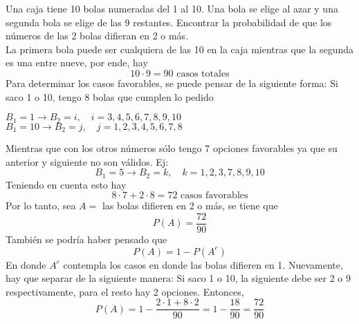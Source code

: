\item Una caja tiene 10 bolas numeradas del 1 al 10. Una bola se elige al azar y una segunda bola se elige de las 9 restantes. Encontrar la probabilidad de que los números de las 2 bolas difieran en 2 o más.\e\\
    La primera bola puede ser cualquiera de las 10 en la caja mientras que la segunda es una entre nueve, por ende, hay \[10\cdot9=90\text{ casos totales}\]
    Para determinar los casos favorables, se puede pensar de la siguiente forma: Si saco 1 o 10, tengo 8 bolas que cumplen lo pedido
    \begin{center}
        $B_1=1\to B_2=i,\quad i=3,4,5,6,7,8,9,10$\\
        $B_1=10\to B_2=j,\quad j=1,2,3,4,5,6,7,8$ 
    \end{center}
    Mientras que con los otros números sólo tengo 7 opciones favorables ya que su anterior y siguiente no son válidos. Ej:\[B_1=5\to B_2=k,\quad k=1,2,3,7,8,9,10\]
    Teniendo en cuenta esto hay\[8\cdot7+2\cdot8=72\text{ casos favorables}\]
    Por lo tanto, sea $A=$ las bolas difieren en 2 o más, se tiene que\[P(A)=\frac{72}{90}\]
    También se podría haber pensado que\[P(A)=1-P(A^c)\]
    En donde $A^c$ contempla los casos en donde las bolas difieren en 1. Nuevamente, hay que separar de la siguiente manera: Si saco 1 o 10, la siguiente debe ser 2 o 9 respectivamente, para el resto hay 2 opciones. Entonces,
    \[P(A)=1-\frac{2\cdot1+8\cdot2}{90}=1-\frac{18}{90}=\frac{72}{90}\]